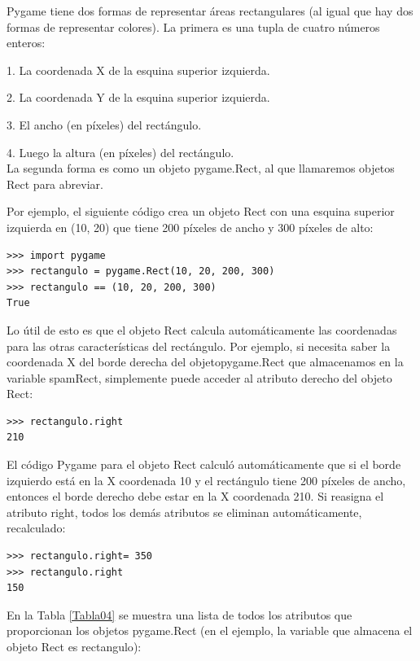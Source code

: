 Pygame tiene dos formas de representar áreas rectangulares (al igual que hay dos formas de representar
colores). La primera es una tupla de cuatro números enteros:

1. La coordenada X de la esquina superior izquierda.

2. La coordenada Y de la esquina superior izquierda.

3. El ancho (en píxeles) del rectángulo.

4. Luego la altura (en píxeles) del rectángulo.\\

La segunda forma es como un objeto {\ttfamily pygame.Rect}, al que llamaremos objetos  {\ttfamily Rect} para abreviar. 

Por ejemplo, el siguiente código crea un objeto  {\ttfamily Rect} con una esquina superior izquierda en (10, 20) que tiene 200 píxeles 
de ancho y 300 píxeles de alto:
\begin{lstlisting}	
>>> import pygame
>>> rectangulo = pygame.Rect(10, 20, 200, 300)
>>> rectangulo == (10, 20, 200, 300)
True
\end{lstlisting}
Lo útil de esto es que el objeto {\ttfamily Rect} calcula automáticamente las coordenadas para
las otras características del rectángulo. Por ejemplo, si necesita saber la coordenada X del 
borde derecha del objeto{\ttfamily pygame.Rect} que almacenamos en la variable {\ttfamily spamRect}, simplemente puede acceder al
atributo derecho del objeto {\ttfamily Rect}:
\begin{lstlisting}
>>> rectangulo.right
210
\end{lstlisting}

El código Pygame para el objeto {\ttfamily Rect} calculó automáticamente que si el borde izquierdo está en la X
coordenada 10 y el rectángulo tiene 200 píxeles de ancho, entonces el borde derecho debe estar en la X
coordenada 210. Si reasigna el atributo {\ttfamily right}, todos los demás atributos se eliminan automáticamente, 
recalculado:
\begin{lstlisting}
>>> rectangulo.right= 350
>>> rectangulo.right
150
\end{lstlisting}

En la Tabla \ref{Tabla04} se muestra una lista de todos los atributos que proporcionan los objetos {\ttfamily pygame.Rect} (en el ejemplo, la variable que almacena el objeto {\ttfamily Rect} es {\ttfamily rectangulo}):


